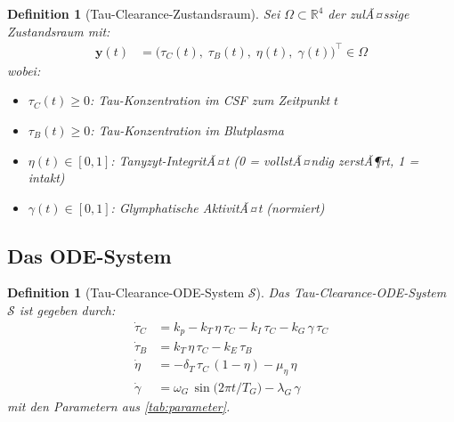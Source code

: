 ﻿\documentclass[12pt,a4paper]{article}
\newtheorem{definition}[theorem]{Definition}
\theoremstyle{definition}
\newcommand{\R}{\mathbb{R}}
\begin{document}
	\begin{definition}[Tau-Clearance-Zustandsraum]
		\label{def:zustandsraum}
		Sei $\Omega \subset \R^4$ der zulÃ¤ssige Zustandsraum mit:
		\begin{align}
			\mathbf{y}(t) &= \bigl(\tau_C(t),\; \tau_B(t),\; \eta(t),\; \gamma(t)\bigr)^\top \in \Omega
		\end{align}
		wobei:
		\begin{itemize}
			\item $\tau_C(t) \geq 0$: Tau-Konzentration im CSF zum Zeitpunkt $t$
			\item $\tau_B(t) \geq 0$: Tau-Konzentration im Blutplasma
			\item $\eta(t) \in [0,1]$: Tanyzyt-IntegritÃ¤t (0 = vollstÃ¤ndig zerstÃ¶rt, 1 = intakt)
			\item $\gamma(t) \in [0,1]$: Glymphatische AktivitÃ¤t (normiert)
		\end{itemize}
	\end{definition}
	
	\subsection{Das ODE-System}
	
	\begin{definition}[Tau-Clearance-ODE-System $\mathcal{S}$]
		\label{def:ode_system}
		Das \emph{Tau-Clearance-ODE-System} $\mathcal{S}$ ist gegeben durch:
		\begin{align}
			\dot{\tau}_C &= k_p - k_T\,\eta\,\tau_C - k_I\,\tau_C - k_G\,\gamma\,\tau_C 
			\label{eq:tau_csf}\\
			\dot{\tau}_B &= k_T\,\eta\,\tau_C - k_E\,\tau_B 
			\label{eq:tau_blood}\\
			\dot{\eta}   &= -\delta_T\,\tau_C\,(1-\eta) - \mu_\eta\,\eta 
			\label{eq:tanyzyt}\\
			\dot{\gamma} &= \omega_G\,\sin\!\bigl(2\pi t / T_G\bigr) - \lambda_G\,\gamma 
			\label{eq:glymph}
		\end{align}
		mit den Parametern aus \cref{tab:parameter}.
	\end{definition}
	
\end{document}
